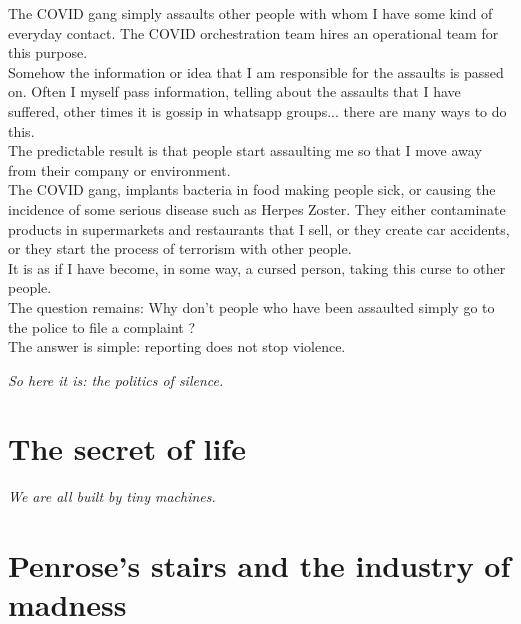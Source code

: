 \documentclass[11pt]{book}
\begin{document}
\noindent The COVID gang simply assaults other people with whom I have some kind of everyday contact. The COVID orchestration team hires an operational team for this purpose. \\

\noindent Somehow the information or idea that I am responsible for the assaults is passed on. Often I myself pass information, telling about the assaults that I have suffered, other times it is gossip in whatsapp groups... there are many ways to do this. \\

\noindent The predictable result is that people start assaulting me so that I move away from their company or environment. \\

\noindent The COVID gang, implants bacteria in food making people sick, or causing the incidence of some serious disease such as Herpes Zoster. They either contaminate products in supermarkets and restaurants that I sell, or they create car accidents, or they start the process of terrorism with other people. \\

\noindent It is as if I have become, in some way, a cursed person, taking this curse to other people. \\

\noindent The question remains: Why don't people who have been assaulted simply go to the police to file a complaint ? \\

\noindent The answer is simple: reporting does not stop violence. \\

\noindent \begin{center} \emph{So here it is: the politics of silence.} \end{center}

\chapter{The secret of life}

\noindent \begin{center} \emph{We are all built by tiny machines.} \end{center}

\chapter{Penrose's stairs and the industry of madness}
\end{document}
